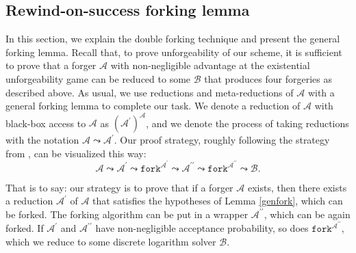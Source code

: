 \documentclass{iacrtrans}
\theoremstyle{definition}
\numberwithin{theorem}{subsection}
\numberwithin{lemma}{theorem}
\newcommand{\adversary}{\mathcal{A}}
\newcommand{\reduxChain}{\adversary \leadsto \adversary^\prime \leadsto \texttt{fork}^{\adversary^\prime}  \leadsto \adversary^{\prime \prime} \leadsto \texttt{fork}^{\adversary^{\prime \prime}} \leadsto \mathcal{B}}
\begin{document}
\subsection{Rewind-on-success forking lemma}\label{forkingLemma}

In this section, we explain the double forking technique and present the general forking lemma. Recall that, to prove unforgeability of our scheme, it is sufficient to prove that a forger $\adversary$ with non-negligible advantage at the existential unforgeability game can be reduced to some $\mathcal{B}$ that produces four forgeries as described above. As usual, we use reductions and meta-reductions of $\adversary$ with a general forking lemma to complete our task. We denote a reduction of $\adversary$ with black-box access to $\adversary$ as $(\adversary^\prime)^\adversary$, and we denote the process of taking reductions with the notation $\adversary \leadsto \adversary^\prime$. Our proof strategy, roughly following the strategy from \cite{maxwell2018simple}, can be visualized this way:
\[\reduxChain.\]

That is to say: our strategy is to prove that if a forger $\mathcal{A}$ exists, then there exists a reduction $\adversary^\prime$ of $\adversary$ that satisfies the hypotheses of Lemma \ref{genfork}, which can be forked. The forking algorithm can be put in a wrapper $\adversary^{\prime \prime}$, which can be again forked. If $\adversary^\prime$ and $\adversary^{\prime \prime}$ have non-negligible acceptance probability, so does $\texttt{fork}^{\adversary^{\prime \prime}}$, which we reduce to some discrete logarithm solver $\mathcal{B}$.

\end{document}
